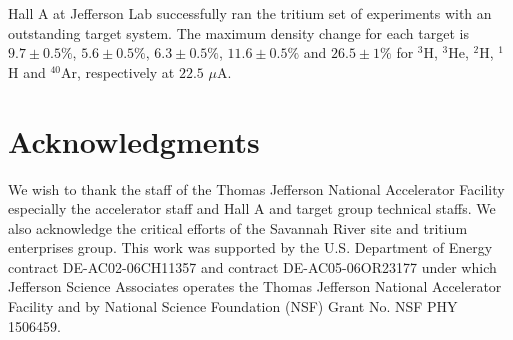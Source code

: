 \documentclass[final,5p,times,twocolumn]{elsarticle}
\begin{document}
Hall A at Jefferson Lab successfully ran the tritium set of experiments with an outstanding target system.  
The maximum density change for each target is $9.7 \pm 0.5 \%$, $5.6 \pm 0.5\% $, $6.3 \pm 0.5\% $, $11.6\pm 0.5\% $ 
and $26.5 \pm 1 \%$ for $^{3}$H, $^{3}$He, $^{2}$H, $^{1}$H and $^{40}$Ar, respectively at $22.5$ $\mu$A. 

\section{Acknowledgments}

We wish to thank the staff of the Thomas Jefferson National Accelerator Facility especially 
the accelerator staff and  Hall A and target group technical staffs. 
We also acknowledge the critical efforts of the Savannah River site and 
tritium enterprises group.
This work was supported by the U.S. Department of Energy contract
DE-AC02-06CH11357 and contract DE-AC05-06OR23177
under which Jefferson Science Associates operates the Thomas Jefferson National
Accelerator Facility and by National Science Foundation (NSF) Grant No. NSF PHY 1506459.

 

\end{document}
